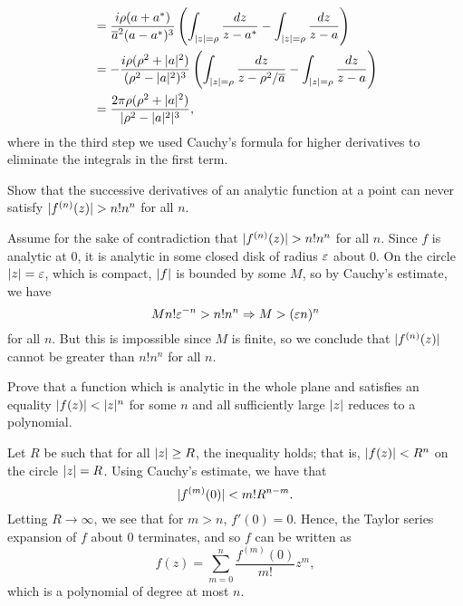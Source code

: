 \begin{exercise}
\begin{sol}
\begin{enumerate}
\begin{align*}
&=\dfrac{i\rho(a+a^*)}{\overline{a}^2(a-a^*)^3}\left(\int_{\lvert z \rvert=\rho}\dfrac{dz}{z-a^*}-\int_{\lvert z \rvert=\rho}\dfrac{dz}{z-a}\right) \\
&=-\dfrac{i\rho(\rho^2+\lvert a \rvert^2)}{(\rho^2-\lvert a \rvert^2)^3}\left(\int_{\lvert z \rvert=\rho}\dfrac{dz}{z-\rho^2/\overline{a}}-\int_{\lvert z \rvert=\rho}\dfrac{dz}{z-a}\right) \\
&=\dfrac{2\pi \rho (\rho^2+\lvert a \rvert^2)}{\lvert \rho^2-\lvert a \rvert^2 \rvert^3},
\end{align*}
where in the third step we used Cauchy's formula for higher derivatives to eliminate the integrals in the first term.
\end{enumerate}
\end{sol}
\end{exercise}
\begin{exercise}
Show that the successive derivatives of an analytic function at a point can never satisfy $\lvert f^{(n)}(z) \rvert>n! n^n$ for all $n$.

\begin{sol}
Assume for the sake of contradiction that $\lvert f^{(n)}(z) \rvert>n! n^n$ for all $n$. Since $f$ is analytic at $0$, it is analytic in some closed disk of radius $\varepsilon$ about $0$. On the circle $\lvert z \rvert=\varepsilon$, which is compact, $\lvert f \rvert$ is bounded by some $M$, so by Cauchy's estimate, we have $$Mn!\varepsilon^{-n}>n! n^n \Rightarrow M>(\varepsilon n)^n$$ for all $n$. But this is impossible since $M$ is finite, so we conclude that $\lvert f^{(n)}(z) \rvert$ cannot be greater than $n! n^n$ for all $n$.
\end{sol}
\end{exercise}
\begin{exercise}
Prove that a function which is analytic in the whole plane and satisfies an equality $\lvert f(z) \rvert<\lvert z \rvert^n$ for some $n$ and all sufficiently large $\lvert z \rvert$ reduces to a polynomial.

\begin{sol}
Let $R$ be such that for all $\lvert z \rvert \ge R$, the inequality holds; that is, $\lvert f(z) \rvert<R^n$ on the circle $\lvert z \rvert=R$. Using Cauchy's estimate, we have that $$\lvert f^{(m)}(0) \rvert<m! R^{n-m}.$$ Letting $R \rightarrow \infty$, we see that for $m>n$, $f'(0)=0$. Hence, the Taylor series expansion of $f$ about $0$ terminates, and so $f$ can be written as $$f(z)=\sum_{m=0}^{n}\dfrac{f^{(m)}(0)}{m!}z^m,$$ which is a polynomial of degree at most $n$.
\end{sol}
\end{exercise}

